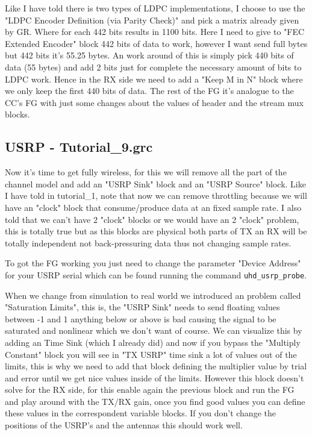 \documentclass[a4paper, 10pt, conference]{ieeeconf}      %
\begin{document}
    Like I have told there is two types of LDPC implementations, I choose to use the "LDPC Encoder Definition (via Parity Check)" and pick a matrix already given by GR. Where for each 442 bits results in 1100 bits. Here I need to give to "FEC Extended Encoder" block 442 bits of data to work, however I want send full bytes but 442 bits it's 55.25 bytes. An work around of this is simply pick 440 bits of data (55 bytes) and add 2 bits just for complete the necessary amount of bits to LDPC work. Hence in the RX side we need to add a "Keep M in N" block where we only keep the first 440 bits of data. The rest of the FG it's analogue to the CC's FG with just some changes about the values of header and the stream mux blocks.

\subsection{USRP - Tutorial\_9.grc}
    Now it's time to get fully wireless, for this we will remove all the part of the channel model and add an "USRP Sink" block and an "USRP Source" block. Like I have told in tutorial\_1, note that now we can remove throttling because we will have an "clock" block that consume/produce data at an fixed sample rate. I also told that we can't have 2 "clock" blocks or we would have an 2 "clock" problem, this is totally true but as this blocks are physical both parts of TX an RX will be totally independent not back-pressuring data thus not changing sample rates.
    
    To got the FG working you just need to change the parameter "Device Address" for your USRP serial which can be found running the command \verb|uhd_usrp_probe|. 
    
    When we change from simulation to real world we introduced an problem called "Saturation Limits", this is, the "USRP Sink" needs to send floating values between -1 and 1 anything below or above is bad causing the signal to be saturated and nonlinear which we don't want of course. We can visualize this by adding an Time Sink (which I already did) and now if you bypass the "Multiply Constant" block you will see in "TX USRP" time sink a lot of values out of the limits, this is why we need to add that block defining the multiplier value by trial and error until we get nice values inside of the limits. However this block doesn't solve for the RX side, for this enable again the previous block and run the FG and play around with the TX/RX gain, once you find good values you can define these values in the correspondent variable blocks. If you don't change the positions of the USRP's and the antennas this should work well.
    
\end{document}
